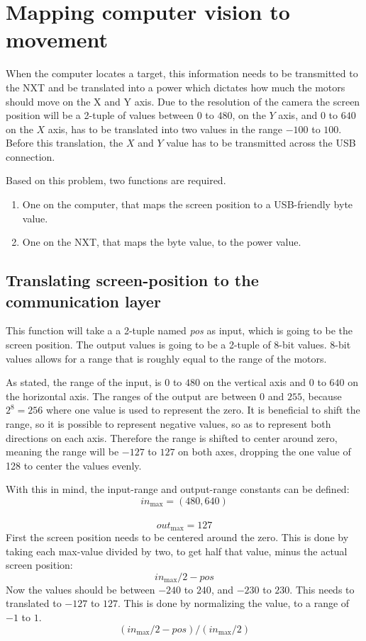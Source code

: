\section{Mapping computer vision to movement}\label{sec:mappingcompvis}
When the computer locates a target, this information needs to be transmitted to the NXT and be translated into a power which dictates how much the motors should move on the X and Y axis.
Due to the resolution of the camera the screen position will be a 2-tuple of values between $0$ to $480$, on the $Y$ axis, and $0$ to $640$ on the $X$ axis, has to be translated into two values in the range $-100$ to $100$.
Before this translation, the $X$ and $Y$ value has to be transmitted across the USB connection.

Based on this problem, two functions are required.
\begin{enumerate}
	\item One on the computer, that maps the screen position to a USB-friendly byte value.
	\item One on the NXT, that maps the byte value, to the power value.
\end{enumerate}


\subsection{Translating screen-position to the communication layer}
This function will take a a 2-tuple named \textit{pos} as input, which is going to be the screen position.
The output values is going to be a 2-tuple of 8-bit values.
8-bit values allows for a range that is roughly equal to the range of the motors.

As stated, the range of the input, is $0$ to $480$ on the vertical axis and $0$ to $640$ on the horizontal axis.
The ranges of the output are between $0$ and $255$, because $2^8 = 256$ where one value is used to represent the zero.
It is beneficial to shift the range, so it is possible to represent negative values, so as to represent both directions on each axis.
Therefore the range is shifted to center around zero, meaning the range will be $-127$ to $127$ on both axes, dropping the one value of 128 to center the values evenly.

With this in mind, the input-range and output-range constants can be defined:\\
$$in_\text{max} = (480,640)$$\\
$$out_\text{max} = 127$$
First the screen position needs to be centered around the zero.
This is done by taking each max-value divided by two, to get half that value, minus the actual screen position:
$$
in_\text{max}/2 - pos
$$
Now the values should be between $-240$ to $240$, and $-230$ to $230$.
This needs to translated to $-127$ to $127$.
This is done by normalizing the value, to a range of $-1$ to $1$.
$$
(in_\text{max}/2 - pos)/(in_\text{max}/2)
$$

